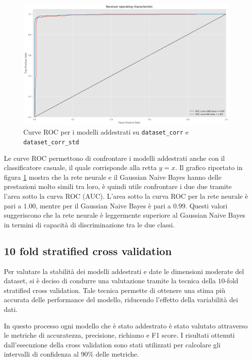 \begin{figure}[!ht]
    \centering
    \includegraphics[width=\textwidth]{img/ris/roc_curve_corr.png}
    \caption{Curve ROC per i modelli addestrati su \texttt{dataset\_corr} e \texttt{dataset\_corr\_std}}
    \label{fig:roc_curve_corr}
\end{figure}

Le curve ROC permettono di confrontare i modelli addestrati anche con il classificatore
casuale, il quale corrisponde alla retta $y = x$. Il grafico riportato in figura
\ref{fig:roc_curve_corr} mostra che la rete neurale e il Gaussian Naive Bayes
hanno delle prestazioni molto simili tra loro, è quindi utile confrontare i due
due tramite l'area sotto la curva ROC (AUC). L'area sotto la curva ROC
per la rete neurale è pari a $1.00$, mentre per il Gaussian Naive Bayes è pari a
$0.99$. Questi valori suggeriscono che la rete neurale è leggermente superiore
al Gaussian Naive Bayes in termini di capacità di discriminazione tra le due
classi.

\subsection{10 fold stratified cross validation} \label{subsec:cross_val}
Per valutare la stabilità dei modelli addestrati e date le dimensioni moderate del
dataset, si è deciso di condurre una valutazione tramite la tecnica della
$10$-fold stratified cross validation. Tale tecnica permette di ottenere una
stima più accurata delle performance del modello, riducendo l'effetto della
variabilità dei dati.

In questo processo ogni modello che è stato addestrato è stato valutato attraverso
le metriche di accuratezza, precisione, richiamo e F1 score. I risultati ottenuti
dall'esecuzione della cross validation sono stati utilizzati per calcolare gli
intervalli di confidenza al $90\%$ delle metriche.

